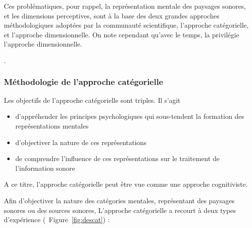 Ces problématiques, pour rappel, la représentation mentale des paysages sonores, et les dimensions perceptives, sont à la base des deux grandes approches méthodologiques adoptées par la communauté scientifique, l'approche catégorielle, et l'approche dimensionnelle. On note cependant qu'avec le temps, la  privilégie l'approche dimensionnelle.

.\\

\subsubsection{Méthodologie de l'approche catégorielle}
\label{sec:appCategorielle}

Les objectifs de l'approche catégorielle sont triples. Il s'agit 

\begin{itemize}
\item d'appréhender les principes psychologiques qui sous-tendent la formation des représentations mentales
\item d'objectiver la nature de ces représentations
\item de comprendre l'influence de ces représentations sur le traitement de l'information sonore
\end{itemize}
 
A ce titre, l'approche catégorielle peut être vue comme une approche cognitiviste. 

Afin d'objectiver la nature des catégories mentales, représentant des paysages sonores ou des sources sonores, L'approche catégorielle a recourt à deux types d'expérience (\Cf~Figure~\ref{fig:descat}) :

